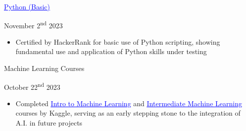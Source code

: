 \documentclass[a4paper,11pt]{article}
\begin{document}
 \begin{minipage}{.65\linewidth}
    \href{https://www.hackerrank.com/certificates/4a8e6ae17626}{\textcolor{blue}{\uline{Python (Basic)}}} 
\end{minipage}
\begin{minipage}{.34\linewidth}
    \flushright
    November 2\textsuperscript{nd} 2023
\end{minipage}
\begin{minipage}{\linewidth}
\vspace{10pt}
\begin{itemize}
    \item Certified by HackerRank for basic use of Python scripting, showing fundamental use and application of Python skills under testing
\end{itemize}
\vspace{1pt}
\end{minipage}

 \begin{minipage}{.65\linewidth}
    Machine Learning Courses 
\end{minipage}
\begin{minipage}{.34\linewidth}
    \flushright
    October 22\textsuperscript{nd} 2023
\end{minipage}
\begin{minipage}{\linewidth}
\vspace{10pt}
\begin{itemize}
    \item Completed \href{https://www.kaggle.com/learn/certification/jeremyfriesen123/intro-to-machine-learning}{\textcolor{blue}{\uline{Intro to Machine Learning}}} and \href{https://www.kaggle.com/learn/certification/jeremyfriesen123/intermediate-machine-learning}{\textcolor{blue}{\uline{Intermediate Machine Learning}}} courses by Kaggle, serving as an early stepping stone to the integration of A.I. in future projects
\end{itemize}
\vspace{1pt}
\end{minipage}
\end{document}
